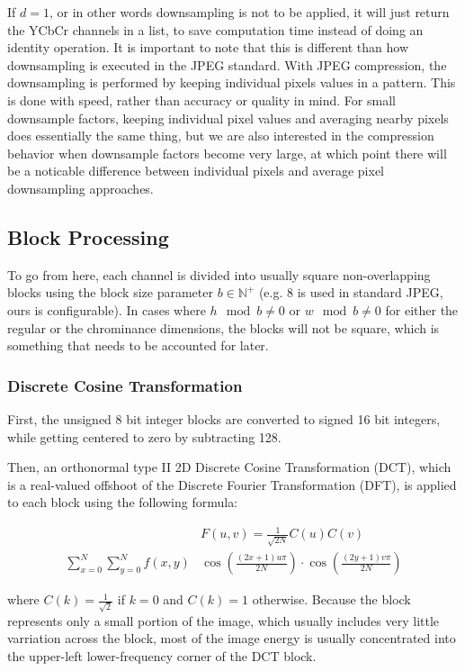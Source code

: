 If \(d = 1\), or in other words downsampling is not to be applied, it will just return the YCbCr channels in a list, to save computation time instead of doing an identity operation.
It is important to note that this is different than how downsampling is executed in the JPEG standard. 
With JPEG compression, the downsampling is performed by keeping individual pixels values in a pattern.
This is done with speed, rather than accuracy or quality in mind. 
For small downsample factors, keeping individual pixel values and averaging nearby pixels does essentially the same thing, but we are also interested in the compression behavior when downsample factors become very large, at which point there will be a noticable difference between individual pixels and average pixel downsampling approaches.

\subsection{Block Processing}
To go from here, each channel is divided into usually square non-overlapping blocks using the block size parameter \(b \in \mathbb{N}^+\) (e.g. 8 is used in standard JPEG, ours is configurable). In cases where \(h \mod b \neq 0\) or \(w \mod b \neq 0\) for either the regular or the chrominance dimensions, the blocks will not be square, which is something that needs to be accounted for later. 

\subsubsection{Discrete Cosine Transformation}
First, the unsigned 8 bit integer blocks are converted to signed 16 bit integers, while getting centered to zero by subtracting 128.

Then, an orthonormal type II 2D Discrete Cosine Transformation (DCT), which is a real-valued offshoot of the Discrete Fourier Transformation (DFT), is applied to each block using the following formula:

\begin{align}
  &F(u, v) = \frac{1}{\sqrt{2N}} C(u)C(v) \\ \sum_{x=0}^{N} \sum_{y=0}^{N} f(x,y)
  &\cos\left( \frac{(2x+1)u\pi}{2N} \right) \cdot \cos\left( \frac{(2y+1)v\pi}{2N} \right)
\end{align}

where $C(k) = \frac{1}{\sqrt{2}}$ if $k = 0$ and $C(k) = 1$ otherwise. Because the block represents only a small portion of the image, which usually includes very little varriation across the block, most of the image energy is usually concentrated into the upper-left lower-frequency corner of the DCT block.

